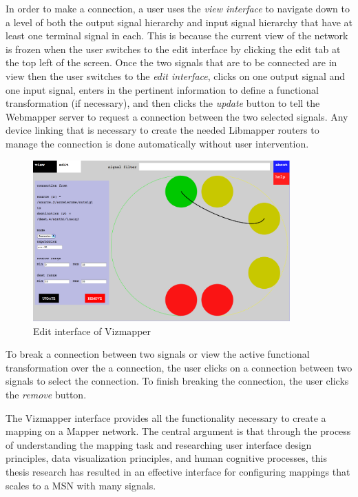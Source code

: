 In order to make a connection, a user uses the \emph{view interface} to navigate down to a level of both the output signal hierarchy and input signal hierarchy that have at least one terminal signal in each. This is because the current view of the network is frozen when the user switches to the edit interface by clicking the edit tab at the top left of the screen. Once the two signals that are to be connected are in view then the user switches to the \emph{edit interface}, clicks on one output signal and one input signal, enters in the pertinent information to define a functional transformation (if necessary), and then clicks the \emph{update} button to tell the Webmapper server to request a connection between the two selected signals. Any device linking that is necessary to create the needed Libmapper routers to manage the connection is done automatically without user intervention.

\begin{figure}[htb]
\centering
\includegraphics[width=0.88\textwidth]{editInterface.png}
\caption{Edit interface of Vizmapper}
\label{fig:editInterface}
\end{figure}

To break a connection between two signals or view the active functional transformation over the a connection, the user clicks on a connection between two signals to select the connection. To finish breaking the connection, the user clicks the \emph{remove} button.

The Vizmapper interface provides all the functionality necessary to create a mapping on a Mapper network. The central argument is that through the process of understanding the mapping task and researching user interface design principles, data visualization principles, and human cognitive processes, this thesis research has resulted in an effective interface for configuring mappings that scales to a MSN with many signals.
